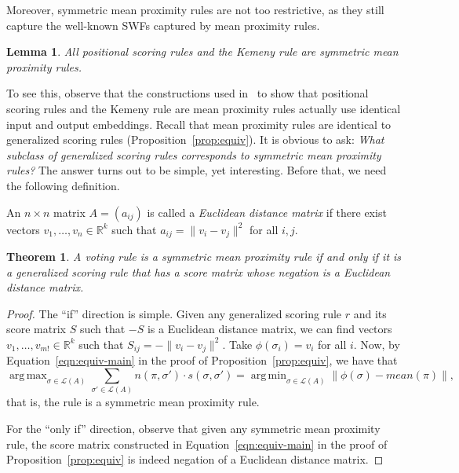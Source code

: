 \documentclass[10pt,letterpaper]{article}
\newcommand{\calL}{{\mathcal{L}}}
\newcommand{\rank}{{\calL(A)}}
\DeclareMathOperator*{\argmax}{arg\,max}
\DeclareMathOperator*{\argmin}{arg\,min}
\newtheorem{theorem}{Theorem}
\newtheorem{lemma}{Lemma}
\newenvironment{definition}[1][Definition]{\begin{trivlist}
\item[\hskip \labelsep {\bfseries #1}]}{\end{trivlist}}
\begin{document}
Moreover, symmetric mean proximity rules are not too restrictive, as they still capture the well-known SWFs captured by mean proximity rules.

\begin{lemma}
All positional scoring rules and the Kemeny rule are symmetric mean proximity rules.
\end{lemma}

To see this, observe that the constructions used in~\cite{Zwicker08a} to show that positional scoring rules and the Kemeny rule are mean proximity rules actually use identical input and output embeddings. Recall that mean proximity rules are identical to generalized scoring rules (Proposition~\ref{prop:equiv}). It is obvious to ask: \emph{What subclass of generalized scoring rules corresponds to symmetric mean proximity rules?} The answer turns out to be simple, yet interesting. Before that, we need the following definition.


\begin{definition}[Euclidean Distance Matrix]
An $n \times n$ matrix $A = (a_{ij})$ is called a \emph{Euclidean distance matrix} if there exist vectors $v_1,\ldots,v_n \in \mathbb{R}^k$ such that $a_{ij} = \|v_i-v_j\|^2$ for all $i,j$. 
\end{definition}

\begin{theorem}
A voting rule is a symmetric mean proximity rule if and only if it is a generalized scoring rule that has a score matrix whose negation is a Euclidean distance matrix. 
\label{thm:symm}
\end{theorem}
\begin{proof}
The ``if'' direction is simple. Given any generalized scoring rule $r$ and its score matrix $S$ such that $-S$ is a Euclidean distance matrix, we can find vectors $v_1,\ldots,v_{m!} \in \mathbb{R}^k$ such that $S_{ij} = -\|v_i-v_j\|^2$. Take $\phi(\sigma_i) = v_i$ for all $i$. Now, by Equation~\eqref{eqn:equiv-main} in the proof of Proposition~\ref{prop:equiv}, we have that 
$$
\argmax_{\sigma \in \rank} \sum_{\sigma' \in \rank} n(\pi,\sigma') \cdot s(\sigma,\sigma') = \argmin_{\sigma \in \rank} \|\phi(\sigma)-mean(\pi)\|,
$$
that is, the rule is a symmetric mean proximity rule. 

For the ``only if'' direction, observe that given any symmetric mean proximity rule, the score matrix constructed in Equation~\eqref{eqn:equiv-main} in the proof of Proposition~\ref{prop:equiv} is indeed negation of a Euclidean distance matrix.
\end{proof}
\end{document}
